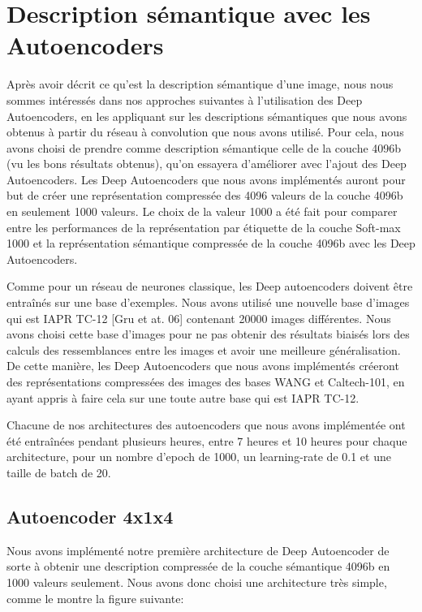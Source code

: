 \section{Description sémantique avec les Autoencoders}
	Après avoir décrit ce qu'est la description sémantique d'une image, nous nous sommes intéressés dans nos approches suivantes à l'utilisation des Deep Autoencoders, en les appliquant sur les descriptions sémantiques que nous avons obtenus à partir du réseau à convolution que nous avons utilisé. Pour cela, nous avons choisi de prendre comme description sémantique celle de la couche 4096b (vu les bons résultats obtenus), qu'on essayera d'améliorer avec l'ajout des Deep Autoencoders.
	Les Deep Autoencoders que nous avons implémentés auront pour but de créer une représentation compressée des 4096 valeurs de la couche 4096b en seulement 1000 valeurs. Le choix de la valeur 1000 a été fait pour comparer entre les performances de la représentation par étiquette de la couche Soft-max 1000 et la représentation sémantique compressée de la couche 4096b avec les Deep Autoencoders.
	
	Comme pour un réseau de neurones classique, les Deep autoencoders doivent être entraînés sur une base d'exemples. Nous avons utilisé une nouvelle base d'images qui est IAPR TC-12 [Gru et at. 06] contenant 20000 images différentes. Nous avons choisi cette base d'images pour ne pas obtenir des résultats biaisés lors des calculs des ressemblances entre les images et avoir une meilleure généralisation. De cette manière, les Deep Autoencoders que nous avons implémentés créeront des représentations compressées des images des bases WANG et Caltech-101, en ayant appris à faire cela sur une toute autre base qui est IAPR TC-12.
	
	Chacune de nos architectures des autoencoders que nous avons implémentée ont été entraînées pendant plusieurs heures, entre 7 heures et 10 heures pour chaque architecture, pour un nombre d'epoch de 1000, un learning-rate de 0.1 et une taille de batch de 20.

\subsection{Autoencoder 4x1x4} 
	Nous avons implémenté notre première architecture de Deep Autoencoder de sorte à obtenir une description compressée de la couche sémantique 4096b en 1000 valeurs seulement. Nous avons donc choisi une architecture très simple, comme le montre la figure suivante:

